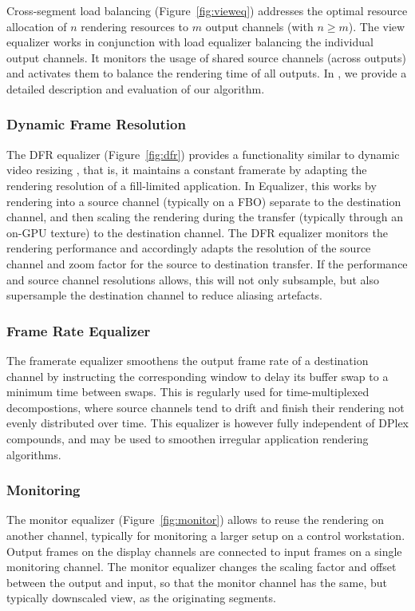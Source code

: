 \documentclass[10pt,journal,compsoc]{IEEEtran}
\newcommand{\fig}[1]{Figure~\ref{#1}}
\begin{document}
Cross-segment load balancing (\fig{fig:vieweq}) addresses the optimal resource
allocation of $n$ rendering resources to $m$ output channels (with $n\geq
m$). The view equalizer works in conjunction with load equalizer balancing the
individual output channels. It monitors the usage of shared source channels
(across outputs) and activates them to balance the rendering time of all
outputs. In \cite{EEP:11}, we provide a detailed description and evaluation of
our algorithm.

\subsubsection{Dynamic Frame Resolution}

The DFR equalizer (\fig{fig:dfr}) provides a functionality similar to dynamic
video resizing \cite{MBDM:97}, that is, it maintains a constant framerate by
adapting the rendering resolution of a fill-limited application. In Equalizer,
this works by rendering into a source channel (typically on a FBO) separate to
the destination channel, and then scaling the rendering during the transfer
(typically through an on-GPU texture) to the destination channel. The DFR
equalizer monitors the rendering performance and accordingly adapts the
resolution of the source channel and zoom factor for the source to destination
transfer. If the performance and source channel resolutions allows, this will
not only subsample, but also supersample the destination channel to reduce
aliasing artefacts.

\subsubsection{Frame Rate Equalizer}\label{sec:framerateEq}

The framerate equalizer smoothens the output frame rate of a destination
channel by instructing the corresponding window to delay its buffer swap to a
minimum time between swaps. This is regularly used for time-multiplexed
decompostions, where source channels tend to drift and finish their rendering
not evenly distributed over time. This equalizer is however fully independent of
DPlex compounds, and may be used to smoothen irregular application rendering
algorithms.

\subsubsection{Monitoring}

The monitor equalizer (\fig{fig:monitor}) allows to reuse the rendering on
another channel, typically for monitoring a larger setup on a control
workstation. Output frames on the display channels are connected to input frames
on a single monitoring channel. The monitor equalizer changes the scaling factor
and offset between the output and input, so that the monitor channel has the
same, but typically downscaled view, as the originating segments.
\end{document}
